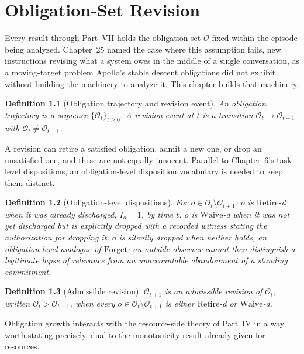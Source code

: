 \documentclass[11pt]{report}
\newtheorem{definition}{Definition}[chapter]
\newcommand{\Forget}{\mathrm{Forget}}
\newcommand{\Retire}{\mathrm{Retire}}
\newcommand{\Waive}{\mathrm{Waive}}
\begin{document}
\chapter{Obligation-Set Revision}

Every result through Part~VII holds the obligation set $\mathcal O$ fixed within the episode being analyzed. Chapter~25 named the case where this assumption fails, new instructions revising what a system owes in the middle of a single conversation, as a moving-target problem Apollo's stable descent obligations did not exhibit, without building the machinery to analyze it. This chapter builds that machinery.

\begin{definition}[Obligation trajectory and revision event]
An obligation trajectory is a sequence $\{\mathcal O_t\}_{t \ge 0}$. A revision event at $t$ is a transition $\mathcal O_t \to \mathcal O_{t+1}$ with $\mathcal O_t \ne \mathcal O_{t+1}$.
\end{definition}

A revision can retire a satisfied obligation, admit a new one, or drop an unsatisfied one, and these are not equally innocent. Parallel to Chapter~6's task-level dispositions, an obligation-level disposition vocabulary is needed to keep them distinct.

\begin{definition}[Obligation-level dispositions]
For $o \in \mathcal O_t \setminus \mathcal O_{t+1}$: $o$ is $\Retire$-d when it was already discharged, $I_o = 1$, by time $t$. $o$ is $\Waive$-d when it was not yet discharged but is explicitly dropped with a recorded witness stating the authorization for dropping it. $o$ is silently dropped when neither holds, an obligation-level analogue of $\Forget$: an outside observer cannot then distinguish a legitimate lapse of relevance from an unaccountable abandonment of a standing commitment.
\end{definition}

\begin{definition}[Admissible revision]
$\mathcal O_{t+1}$ is an admissible revision of $\mathcal O_t$, written $\mathcal O_t \triangleright \mathcal O_{t+1}$, when every $o \in \mathcal O_t \setminus \mathcal O_{t+1}$ is either $\Retire$-d or $\Waive$-d.
\end{definition}

Obligation growth interacts with the resource-side theory of Part~IV in a way worth stating precisely, dual to the monotonicity result already given for resources.
\end{document}
